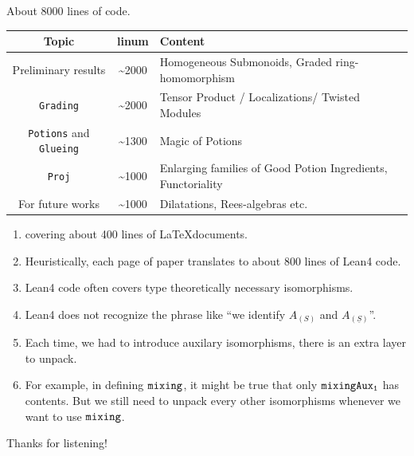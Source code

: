 \documentclass[9pt]{beamer}
\begin{document}
\begin{frame}[fragile]
  About 8000 lines of code.
    \begin{tabular}{c|c|p{}}
      Topic & linum & Content \\ \hline
      Preliminary results & \textasciitilde 2000 & Homogeneous Submonoids, Graded ring-homomorphism \\\hline
      \texttt{Grading} & \textasciitilde 2000 & Tensor Product / Localizations/ Twisted Modules \\\hline
      \texttt{Potions} and  \texttt{Glueing} &  \textasciitilde 1300 &  Magic of Potions \\\hline
      \texttt{Proj} & \textasciitilde 1000 & Enlarging families of Good Potion Ingredients, Functoriality \\\hline
      For future works & \textasciitilde 1000 & Dilatations, Rees-algebras etc.
    \end{tabular}
  \begin{enumerate}
    \item<2-> covering about 400 lines of \LaTeX documents.
    \item<3-> Heuristically, each page of paper translates to about 800 lines of Lean4 code.
    \item<4-> Lean4 code often covers type theoretically necessary isomorphisms.
    \item<5-> Lean4 does not recognize the phrase like ``we identify $A_{(S)}$ and $A_{(\underline{S})}$''.
    \item<6-> Each time, we had to introduce auxilary isomorphisms, 
      there is an extra layer to unpack. 
    \item<7-> For example, in defining ${\footnotesize{\mathtt{mixing}}}$, 
      it might be true that only ${\footnotesize{\mathtt{mixingAux_{1}}}}$ has contents. 
      But we still need to unpack every other isomorphisms whenever we want to use ${\footnotesize{\mathtt{mixing}}}$.
  \end{enumerate}
\end{frame}

\begin{frame}
\begin{center}
Thanks for listening!
\end{center}
\end{frame}
\end{document}
